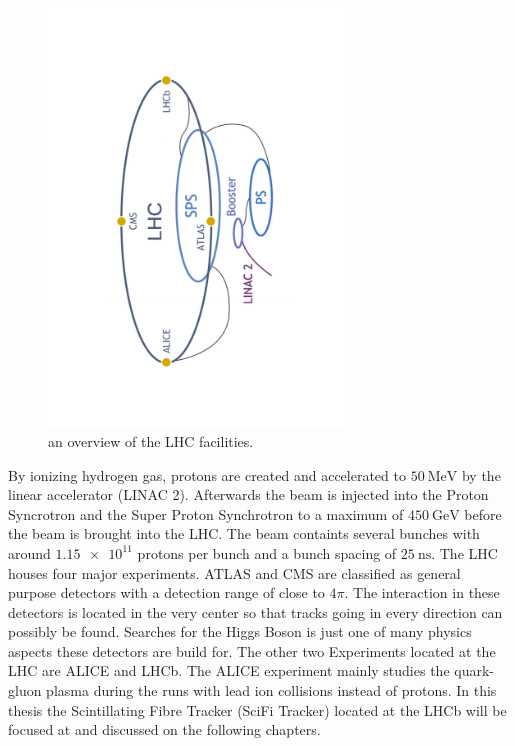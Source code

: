 \begin{figure}
  \centering
  \includegraphics[angle=-90, origin=c, width=0.7\textwidth]{plots/CERN_layout.pdf}
  \caption{an overview of the LHC facilities\cite{facilityCERN}.}
  \label{fig:CERN}
\end{figure}

By ionizing hydrogen gas, protons are created and accelerated to $\SI{50}{\mega\electronvolt}$ by the linear accelerator (LINAC 2). Afterwards the beam is injected into the Proton Syncrotron and the Super Proton Synchrotron to a maximum of $\SI{450}{\giga\electronvolt}$ before the beam is brought into the LHC.
The beam containts several bunches with around $\num{1.15e11}$ protons per bunch and a bunch spacing of $\SI{25}{\nano\second}$.%
The LHC houses four major experiments. ATLAS and CMS are classified as general purpose detectors with a detection range of close to $4\pi$. The interaction in these detectors is located in the very center so that tracks going in every direction can possibly be found. Searches for the Higgs Boson is just one of many physics aspects these detectors are build for.
The other two Experiments located at the LHC are ALICE and LHCb.
The ALICE experiment mainly studies the quark-gluon plasma during the runs with lead ion collisions instead of protons.
In this thesis the Scintillating Fibre Tracker (SciFi Tracker) located at the LHCb will be focused at and discussed on the following chapters.

